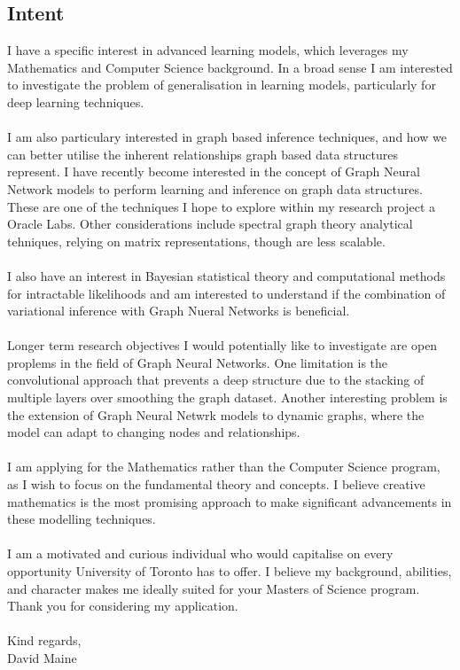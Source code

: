 \subsection*{Intent}
I have a specific interest in advanced learning models, which leverages my Mathematics and Computer Science background. In a broad sense I am interested to investigate the problem of generalisation in learning models, particularly for deep learning techniques.\\
\\
I am also particulary interested in graph based inference techniques, and how we can better utilise the inherent relationships graph based data structures represent. I have recently become interested in the concept of Graph Neural Network models to perform learning and inference on graph data structures. These are one of the techniques I hope to explore within my research project a Oracle Labs. Other considerations include spectral graph theory analytical tehniques, relying on matrix representations, though are less scalable.\\
\\
I also have an interest in Bayesian statistical theory and computational methods for intractable likelihoods and am interested to understand if the combination of variational inference with Graph Nueral Networks is beneficial.\\
\\
Longer term research objectives I would potentially like to investigate are open proplems in the field of Graph Neural Networks. One limitation is the convolutional approach that prevents a deep structure due to the stacking of multiple layers over smoothing the graph dataset. Another interesting problem is the extension of Graph Neural Netwrk models to dynamic graphs, where the model can adapt to changing nodes and relationships.\\
\\
I am applying for the Mathematics rather than the Computer Science program, as I wish to focus on the fundamental theory and concepts. I believe creative mathematics is the most promising approach to make significant advancements in these modelling techniques.\\
\\
I am a motivated and curious individual who would capitalise on every opportunity University of Toronto has to offer. I believe my background, abilities, and character makes me ideally suited for your Masters of Science program. Thank you for considering my application.\\
\\

Kind regards,\\
David Maine